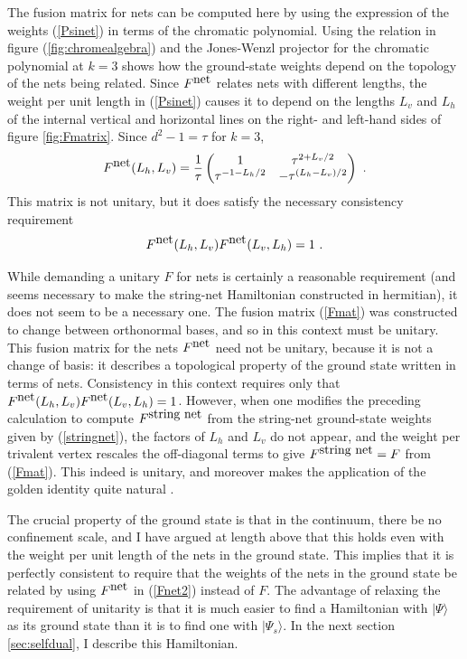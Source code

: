 \documentclass[11pt]{article}
\begin{document}
The fusion matrix for nets can be computed here by using the
expression of the weights (\ref{Psinet}) in terms of the chromatic
polynomial. Using the relation in figure (\ref{fig:chromealgebra}) 
and the Jones-Wenzl projector for the chromatic polynomial at
$k=3$ \cite{FF,FKrush} shows how the ground-state weights
depend on the topology of the nets being related. 
Since $F^{\hbox{net}}$ relates nets with different lengths,
the weight
per unit length in (\ref{Psinet}) causes 
it to depend
on the lengths $L_v$ and $L_h$ of the 
internal vertical and horizontal lines on the right- and left-hand
sides of figure \ref{fig:Fmatrix}. Since $d^2-1=\tau$ for $k=3$,
\begin{equation}
F^{\hbox{net}}(L_h,L_v)=\frac{1}{\tau}
\begin{pmatrix}
1 & \tau^{2+L_v/2}\\
\tau^{-1-L_h/2} & -\tau^{(L_h-L_v)/2}
\end{pmatrix}\ .
\label{Fnet2}
\end{equation}
This matrix is not unitary, but it does satisfy the necessary
consistency requirement
$$F^{\hbox{net}}(L_h,L_v) F^{\hbox{net}}(L_v,L_h)=1\ .$$


While demanding a unitary $F$ for nets is certainly a reasonable
requirement (and seems necessary to make the string-net Hamiltonian
constructed in \cite{LevinWen} hermitian), it does not seem to be a
necessary one. The fusion matrix (\ref{Fmat}) was constructed to
change between orthonormal bases, and so in this context must be
unitary. This fusion matrix for the nets $F^{\hbox{net}}$ need not be
unitary, because it is not a change of basis: it describes a
topological property of the ground state written in terms of nets.
Consistency in this context requires only that
$F^{\hbox{net}}(L_h,L_v)F^{\hbox{net}}(L_v,L_h)=1$. However, when one
modifies the preceding calculation to compute $F^{\hbox{string net}}$
from the string-net ground-state weights given by (\ref{stringnet}),
the factors of $L_h$ and $L_v$ do not appear, and the weight per
trivalent vertex rescales the off-diagonal terms to give
$F^{\hbox{string net}}=F$ from (\ref{Fmat}). This indeed is unitary,
and moreover makes the application of the golden identity quite
natural \cite{Fidkowski}.


The crucial property of the ground state is that in the continuum,
there be no confinement scale, and I have argued at length above that
this holds even with the weight per unit length of the nets in the
ground state. This implies that it is perfectly consistent to require
that the weights of the nets in the ground state be related by using
$F^{\hbox{net}}$ in (\ref{Fnet2}) instead of $F$.  The advantage of
relaxing the requirement of unitarity is that it is much easier to
find a Hamiltonian with $|\Psi\rangle$ as its ground state than it is
to find one with $|\Psi_s\rangle$. In the next section
\ref{sec:selfdual}, I describe this Hamiltonian.
\end{document}
